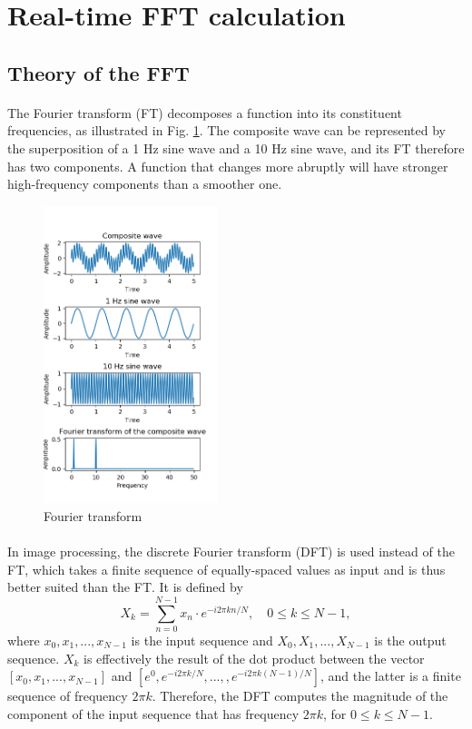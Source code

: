 \documentclass[12pt, twocolumn]{report}
\begin{document}
\section{Real-time FFT calculation}
\subsection{Theory of the FFT}
\paragraph{}
The Fourier transform (FT) decomposes a function into its constituent frequencies, as illustrated in Fig. \ref{FT demonstration}. The composite wave can be represented by the superposition of a 1 Hz sine wave and a 10 Hz sine wave, and its FT therefore has two components. A function that changes more abruptly will have stronger high-frequency components than a smoother one.

\begin{figure}[htbp]
    \centering
    \includegraphics[width=0.45\textwidth]{Figures/FT demonstration.png}
    \caption{Fourier transform}
    \label{FT demonstration}
\end{figure}

\paragraph{}
In image processing, the discrete Fourier transform (DFT) is used instead of the FT, which takes a finite sequence of equally-spaced values as input and is thus better suited than the FT. It is defined by
\begin{equation}
    X_k = \sum_{n=0}^{N-1} x_n \cdot e^{-i2\pi kn/N}, \quad 0 \leq k \leq N-1,
    \label{FT DFT}
\end{equation}
where $x_0,x_1,...,x_{N-1}$ is the input sequence and $X_0,X_1,...,X_{N-1}$ is the output sequence. $X_k$ is effectively the result of the dot product between the vector $[x_0,x_1,...,x_{N-1}]$ and $[e^0,e^{-i2\pi k/N},...,,e^{-i2\pi k(N-1)/N}]$, and the latter is a finite sequence of frequency $2\pi k$. Therefore, the DFT computes the magnitude of the component of the input sequence that has frequency $2\pi k$, for $0 \leq k \leq N-1$.
\end{document}
